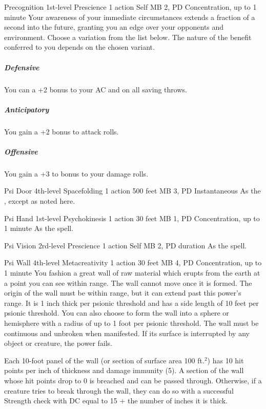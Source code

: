 \DndPowerHeader%
  {Precognition}
  {1st-level Prescience}
  {1 action}
  {Self}
  {MB 2, PD \lvlone}
  {Concentration, up to 1 minute}
Your awareness of your immediate circumstances extends
a fraction of a second into the future,
granting you an edge over your opponents and environment.
Choose a variation from the list below.
The nature of the benefit conferred to you
depends on the chosen variant.
\subparagraph{Defensive}
  You can a +2 bonus to your AC and on all saving throws.
\subparagraph{Anticipatory}
  You gain a +2 bonus to attack rolls.
\subparagraph{Offensive}
  You gain a +3 to bonus to your damage rolls.

\DndPowerHeader%
  {Psi Door}
  {4th-level Spacefolding}
  {1 action}
  {500 feet}
  {MB 3, PD \lvlfour}
  {Instantaneous}
As the , except as noted here.

\DndPowerHeader%
  {Psi Hand}
  {1st-level Psychokinesis}
  {1 action}
  {30 feet}
  {MB 1, PD \lvlone}
  {Concentration, up to 1 minute}
As the  spell.

\DndPowerHeader%
  {Psi Vision}
  {2rd-level Prescience}
  {1 action}
  {Self}
  {MB 2, PD \lvltwo}
  {duration}
As the  spell.

\DndPowerHeader%
  {Psi Wall}
  {4th-level Metacreativity}
  {1 action}
  {30 feet}
  {MB 4, PD \lvlfour}
  {Concentration, up to 1 minute}
You fashion a great wall of raw material which erupts from the earth
at a point you can see within range.
The wall cannot move once it is formed.
The origin of the wall must be within range,
but it can extend past this power's range.
It is 1 inch thick per psionic threshold
and has a side length of 10 feet per psionic threshold.
You can also choose to form the wall into a sphere or hemisphere
with a radius of up to 1 foot per psionic threshold.
The wall must be continuous and unbroken when manifested.
If its surface is interrupted by any object or creature,
the power fails.

Each 10-foot panel of the wall
(or section of surface area 100 ft.$^2$)
has 10 hit points per inch of thickness
and damage immunity (5).
A section of the wall whose hit points drop to 0 is breached
and can be passed through.
Otherwise, if a creature tries to break through the wall,
they can do so with a successful Strength check with
DC equal to 15 + the number of inches it is thick.

